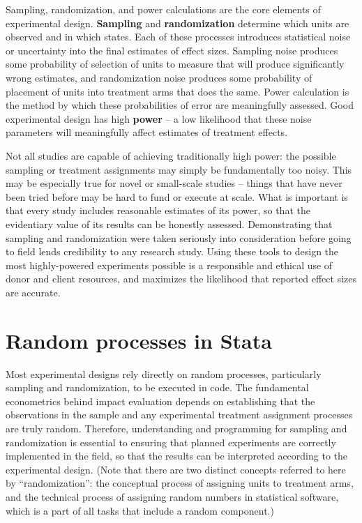 
\begin{fullwidth}
Sampling, randomization, and power calculations are the core elements of experimental design.
\textbf{Sampling} and \textbf{randomization} determine
which units are observed and in which states.
Each of these processes introduces statistical noise
or uncertainty into the final estimates of effect sizes.
Sampling noise produces some probability of
selection of units to measure that will produce significantly wrong estimates, and
randomization noise produces some probability of
placement of units into treatment arms that does the same.
Power calculation is the method by which these probabilities of error are meaningfully assessed.
Good experimental design has high \textbf{power} -- a low likelihood that these noise parameters
will meaningfully affect estimates of treatment effects.

Not all studies are capable of achieving traditionally high power:
the possible sampling or treatment assignments may simply be fundamentally too noisy.
This may be especially true for novel or small-scale studies --
things that have never been tried before may be hard to fund or execute at scale.
What is important is that every study includes reasonable estimates of its power,
so that the evidentiary value of its results can be honestly assessed.
Demonstrating that sampling and randomization were taken seriously into consideration
before going to field lends credibility to any research study.
Using these tools to design the most highly-powered experiments possible
is a responsible and ethical use of donor and client resources,
and maximizes the likelihood that reported effect sizes are accurate.
\end{fullwidth}


\section{Random processes in Stata}

Most experimental designs rely directly on random processes,
particularly sampling and randomization, to be executed in code.
The fundamental econometrics behind impact evaluation
depends on establishing that the observations in the sample
and any experimental treatment assignment processes are truly random.
Therefore, understanding and programming for sampling and randomization
is essential to ensuring that planned experiments
are correctly implemented in the field, so that the results
can be interpreted according to the experimental design.
(Note that there are two distinct concepts referred to here by ``randomization'':
the conceptual process of assigning units to treatment arms,
and the technical process of assigning random numbers in statistical software,
which is a part of all tasks that include a random component.)

